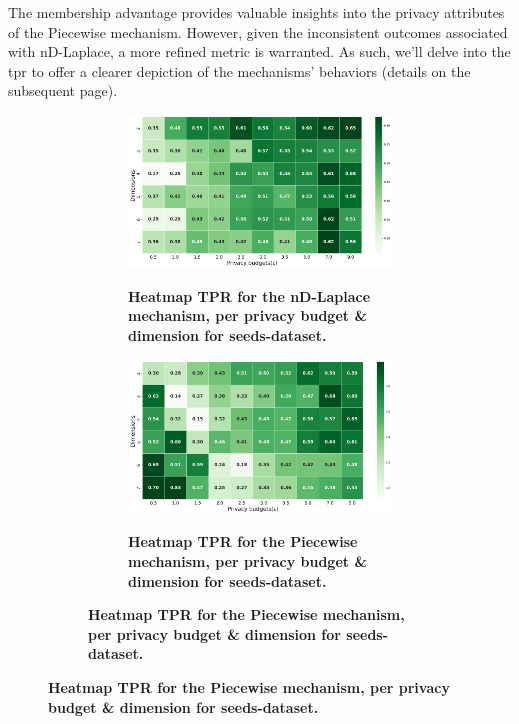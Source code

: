 The membership advantage provides valuable insights into the privacy attributes of the Piecewise mechanism. However, given the inconsistent outcomes associated with nD-Laplace, a more refined metric is warranted. As such, we'll delve into the \gls{tpr} to offer a clearer depiction of the mechanisms' behaviors (details on the subsequent page).\newpage
\begin{figure}[H]
  \centering
  \begin{subfigure}[b]{0.75\textwidth}
    \begin{subfigure}[c]{1\textwidth}
      \caption{\textbf{Heatmap TPR for the nD-Laplace mechanism, per privacy budget \& dimension for seeds-dataset.}}
      \includegraphics[width=1\textwidth]{Results/nd-laplace/nd-Laplace/seeds-dataset/tpr.png}
      \label{fig:privacy_tpr_seeds-dataset_adversial_advantage_kd-laplace}
    \end{subfigure}
    \vfill %
    \begin{subfigure}[c]{1\textwidth}
      \caption{\textbf{Heatmap TPR for the Piecewise mechanism, per privacy budget \& dimension for seeds-dataset.}}
      \includegraphics[width=1\textwidth]{Results/nd-laplace/piecewise/seeds-dataset/tpr.png}
      \label{fig:privacy_tpr_seeds-dataset_adversial_advantage_piecewise}
    \end{subfigure}
  \end{subfigure}
\end{figure}
